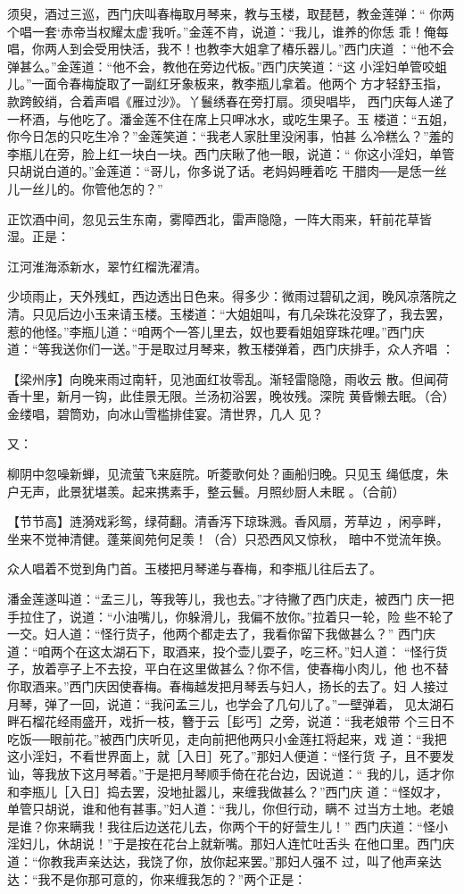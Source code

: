 须臾，酒过三巡，西门庆叫春梅取月琴来，教与玉楼，取琵琶，教金莲弹：“
你两个唱一套‘赤帝当权耀太虚’我听。”金莲不肯，说道：“我儿，谁养的你恁
乖！俺每唱，你两人到会受用快活，我不！也教李大姐拿了椿乐器儿。”西门庆道
：“他不会弹甚么。”金莲道：“他不会，教他在旁边代板。”西门庆笑道：“这
小淫妇单管咬蛆儿。”一面令春梅旋取了一副红牙象板来，教李瓶儿拿着。他两个
方才轻舒玉指，款跨鲛绡，合着声唱《雁过沙》。丫鬟绣春在旁打扇。须臾唱毕，
西门庆每人递了一杯酒，与他吃了。潘金莲不住在席上只呷冰水，或吃生果子。玉
楼道：“五姐，你今日怎的只吃生冷？”金莲笑道：“我老人家肚里没闲事，怕甚
么冷糕么？”羞的李瓶儿在旁，脸上红一块白一块。西门庆瞅了他一眼，说道：“
你这小淫妇，单管只胡说白道的。”金莲道：“哥儿，你多说了话。老妈妈睡着吃
干腊肉──是恁一丝儿一丝儿的。你管他怎的？”

正饮酒中间，忽见云生东南，雾障西北，雷声隐隐，一阵大雨来，轩前花草皆
湿。正是：

江河淮海添新水，翠竹红榴洗濯清。

少顷雨止，天外残虹，西边透出日色来。得多少：微雨过碧矶之润，晚风凉落院之
清。只见后边小玉来请玉楼。玉楼道：“大姐姐叫，有几朵珠花没穿了，我去罢，
惹的他怪。”李瓶儿道：“咱两个一答儿里去，奴也要看姐姐穿珠花哩。”西门庆
道：“等我送你们一送。”于是取过月琴来，教玉楼弹着，西门庆排手，众人齐唱
：

【梁州序】向晚来雨过南轩，见池面红妆零乱。渐轻雷隐隐，雨收云
散。但闻荷香十里，新月一钩，此佳景无限。兰汤初浴罢，晚妆残。深院
黄昏懒去眠。（合）金缕唱，碧筒劝，向冰山雪槛排佳宴。清世界，几人
见？

又：

柳阴中忽噪新蝉，见流萤飞来庭院。听菱歌何处？画船归晚。只见玉
绳低度，朱户无声，此景犹堪羡。起来携素手，整云鬟。月照纱厨人未眠
。（合前）

【节节高】涟漪戏彩鸳，绿荷翻。清香泻下琼珠溅。香风扇，芳草边
，闲亭畔，坐来不觉神清健。蓬莱阆苑何足羡！（合）只恐西风又惊秋，
暗中不觉流年换。

众人唱着不觉到角门首。玉楼把月琴递与春梅，和李瓶儿往后去了。

潘金莲遂叫道：“孟三儿，等我等儿，我也去。”才待撇了西门庆走，被西门
庆一把手拉住了，说道：“小油嘴儿，你躲滑儿，我偏不放你。”拉着只一轮，险
些不轮了一交。妇人道：“怪行货子，他两个都走去了，我看你留下我做甚么？”
西门庆道：“咱两个在这太湖石下，取酒来，投个壶儿耍子，吃三杯。”妇人道：
“怪行货子，放着亭子上不去投，平白在这里做甚么？你不信，使春梅小肉儿，他
也不替你取酒来。”西门庆因使春梅。春梅越发把月琴丢与妇人，扬长的去了。妇
人接过月琴，弹了一回，说道：“我问孟三儿，也学会了几句儿了。”一壁弹着，
见太湖石畔石榴花经雨盛开，戏折一枝，簪于云［髟丐］之旁，说道：“我老娘带
个三日不吃饭──眼前花。”被西门庆听见，走向前把他两只小金莲扛将起来，戏
道：“我把这小淫妇，不看世界面上，就［入日］死了。”那妇人便道：“怪行货
子，且不要发讪，等我放下这月琴着。”于是把月琴顺手倚在花台边，因说道：“
我的儿，适才你和李瓶儿［入日］捣去罢，没地扯嚣儿，来缠我做甚么？”西门庆
道：“怪奴才，单管只胡说，谁和他有甚事。”妇人道：“我儿，你但行动，瞒不
过当方土地。老娘是谁？你来瞒我！我往后边送花儿去，你两个干的好营生儿！”
西门庆道：“怪小淫妇儿，休胡说！”于是按在花台上就新嘴。那妇人连忙吐舌头
在他口里。西门庆道：“你教我声亲达达，我饶了你，放你起来罢。”那妇人强不
过，叫了他声亲达达：“我不是你那可意的，你来缠我怎的？”两个正是：

